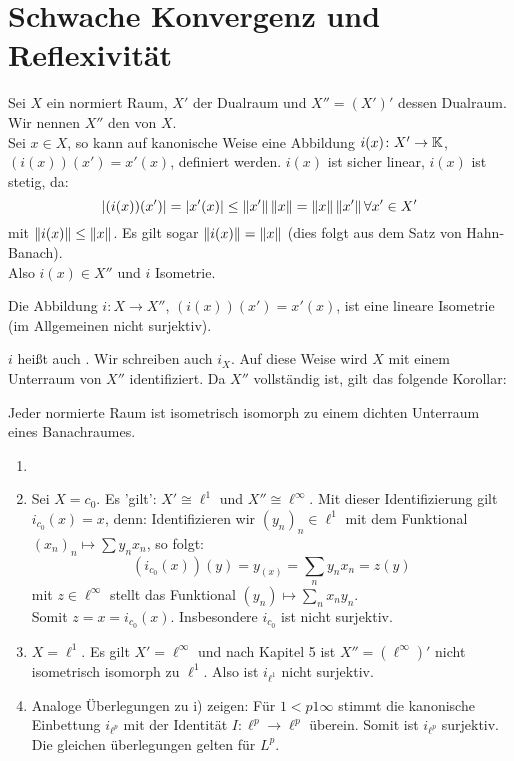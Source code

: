 \chapter{Schwache Konvergenz und Reflexivit\"at}
Sei $ X $ ein normiert Raum, $ X' $ der Dualraum und $ X''=(X')' $ dessen Dualraum. Wir nennen $ X'' $ den  von $ X $.\\
Sei $ x\in X $, so kann auf kanonische Weise eine Abbildung $ i(x)\colon X'\rightarrow\mathbb{K} $, $ (i(x))(x')=x'(x) $, definiert werden. $ i(x) $ ist sicher linear, $ i(x) $ ist stetig, da:
\[ |(i(x))(x')|=|x'(x)|\leq\left\|x'\right\|\left\|x\right\|=\left\|x\right\|\left\|x'\right\|\forall x'\in X' \]
mit $ \left\|i(x)\right\|\leq\left\|x\right\| $. Es gilt sogar $ \left\|i(x)\right\|=\left\|x\right\| $ (dies folgt aus dem Satz von Hahn-Banach).\\
Also $ i(x)\in X'' $ und $ i $ Isometrie.\\
\begin{satz}
	Die Abbildung $ i\colon X\rightarrow X'' $, $ (i(x))(x')=x'(x) $, ist eine lineare Isometrie (im Allgemeinen nicht surjektiv).
\end{satz}
$ i $ hei\ss t auch . Wir schreiben auch $ i_X $. Auf diese Weise wird $ X $ mit einem Unterraum von $ X'' $ identifiziert. Da $ X'' $ vollst\"andig ist, gilt das folgende Korollar:\\
\begin{korollar}
	Jeder normierte Raum ist isometrisch isomorph zu einem dichten Unterraum eines Banachraumes.
\end{korollar}
\begin{beispiel*}
	\begin{enumerate}
		\item[]
		\item Sei $ X=c_0 $. Es 'gilt': $ X'\cong\ell^1 $ und $ X''\cong\ell^\infty $. Mit dieser Identifizierung gilt $ i_{c_0}(x)=x $, denn: Identifizieren wir $ (y_n)_n\in\ell^1 $ mit dem Funktional $ (x_n)_n\mapsto\sum y_nx_n $, so folgt:
		\[ (i_{c_0}(x))(y)=y_(x)=\sum_n y_nx_n=z(y) \]
		mit $ z\in\ell^\infty $ stellt das Funktional $ (y_n)\mapsto\sum_n x_n y_n $.\\
		Somit $ z=x=i_{c_0}(x) $. Insbesondere $ i_{c_0} $ ist nicht surjektiv.
		\item $ X=\ell^1 $. Es gilt $ X'=\ell^\infty $ und nach Kapitel 5 ist $ X''=(\ell^\infty)' $ nicht isometrisch isomorph zu $ \ell^1 $. Also ist $ i_{\ell^1} $ nicht surjektiv.
		\item Analoge \"Uberlegungen zu i) zeigen: F\"ur $ 1<p1\infty $ stimmt die kanonische Einbettung $ i_{\ell^p} $ mit der Identit\"at $ I\colon \ell^p\rightarrow\ell^p $ \"uberein. Somit ist $ i_{\ell^p} $ surjektiv.\\
		Die gleichen \"uberlegungen gelten f\"ur $ L^p $.
	\end{enumerate}
\end{beispiel*}
